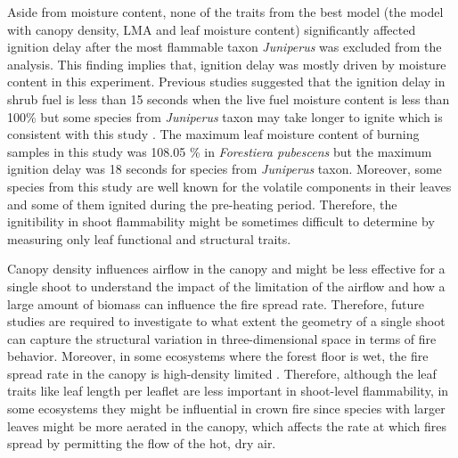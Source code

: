 \documentclass{ttuthes2007}
\begin{document}
Aside from moisture content, %
none of the traits from the best model (the model with canopy density, LMA and leaf moisture content) significantly affected ignition delay after the most flammable taxon \emph{Juniperus} was excluded from the analysis. %
This finding implies that, ignition delay was mostly driven by moisture content in this experiment. Previous studies suggested that the ignition delay in shrub fuel is less than 15 seconds when the live fuel moisture content %
is less than 100\% but some species from \emph{Juniperus} taxon may take longer to ignite which is consistent with this study \citep{pellizzaro2007seasonal}. The maximum leaf moisture content of burning samples
in this study was 108.05 \% in \emph{Forestiera pubescens} but the maximum ignition delay was 18 seconds for species from \emph{Juniperus} taxon.
Moreover, some species from this study are well known for the volatile components in their leaves and some of them  ignited during the pre-heating period. Therefore, the ignitibility in shoot flammability might be sometimes difficult to determine by measuring only leaf functional and structural traits.

Canopy density influences airflow in the canopy \citep{cionco1978analysis} and might be less effective for a single shoot to understand the impact of the limitation of the airflow and how a large amount of biomass can influence the fire spread rate. %
Therefore, future studies are required to investigate to what extent the geometry of a single shoot can capture the structural variation in three-dimensional space in terms of fire behavior. Moreover, in some ecosystems where the forest floor is wet, the fire spread rate in the canopy is high-density limited  \citep{ray2005micrometeorological}. Therefore, although the leaf traits like leaf length per leaflet are less important in shoot-level flammability, in some ecosystems they might be influential in crown fire since species with larger leaves might be more aerated in the canopy, which affects the rate at which fires spread by permitting the flow of the hot, dry air. 
\end{document}
